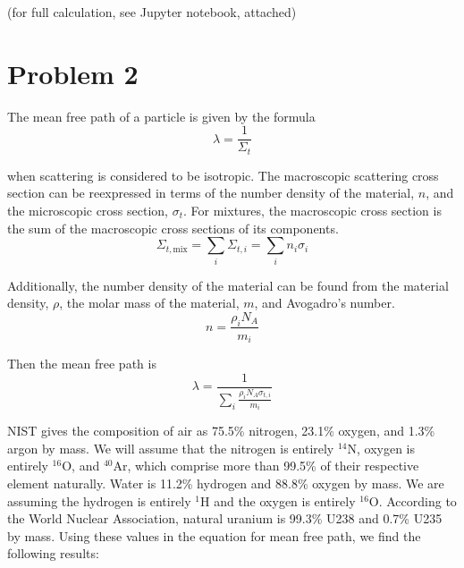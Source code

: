 \documentclass{article}
\begin{document}
(for full calculation, see Jupyter notebook, attached)




\section*{Problem 2}

The mean free path of a particle is given by the formula
$$ \lambda = \frac{1}{\Sigma_t} $$

when scattering is considered to be isotropic. The macroscopic scattering cross section can be reexpressed in terms of the number density of the material, $n$, and the microscopic cross section, $\sigma_t$. For mixtures, the macroscopic cross section is the sum of the macroscopic cross sections of its components.
$$ \Sigma_{t,\text{mix}} = \sum_i \Sigma_{t,i} = \sum_i n_i \sigma_i $$

Additionally, the number density of the material can be found from the material density, $\rho$, the molar mass of the material, $m$, and Avogadro's number.
$$ n = \frac{\rho_i N_A}{m_i} $$

Then the mean free path is
$$ \lambda = \frac{1}{\sum_i \frac{\rho_i N_A \sigma_{t,i}}{m_i}} $$

NIST gives the composition of air as 75.5\% nitrogen, 23.1\% oxygen, and 1.3\% argon by mass. We will assume that the nitrogen is entirely $^{14}$N, oxygen is entirely $^{16}$O, and $^{40}$Ar, which comprise more than 99.5\% of their respective element naturally. Water is 11.2\% hydrogen and 88.8\% oxygen by mass. We are assuming the hydrogen is entirely $^{1}$H and the oxygen is entirely $^{16}$O. According to the World Nuclear Association, natural uranium is 99.3\% U238 and 0.7\% U235 by mass. Using these values in the equation for mean free path, we find the following results:
\end{document}
